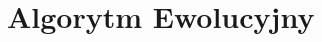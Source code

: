 \documentclass{beamer}
\begin{document}
% 
% 
% 
% 
% 
% 
% 
% 
% 
% 
% 
% 
% 
% 
% 
% 
% 


\section{Algorytm Ewolucyjny}
\end{document}

